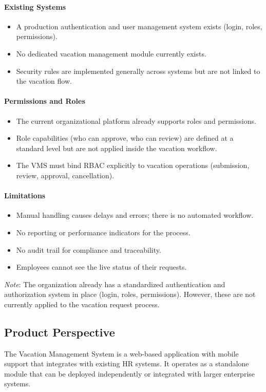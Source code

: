 \documentclass[12pt,a4paper]{article}
\begin{document}
\paragraph{Existing Systems}
\begin{itemize}
    \item A production authentication and user management system exists (login, roles, permissions).
    \item No dedicated vacation management module currently exists.
    \item Security rules are implemented generally across systems but are not linked to the vacation flow.
\end{itemize}

\paragraph{Permissions and Roles}
\begin{itemize}
    \item The current organizational platform already supports roles and permissions.
    \item Role capabilities (who can approve, who can review) are defined at a standard level but are not applied inside the vacation workflow.
    \item The VMS must bind RBAC explicitly to vacation operations (submission, review, approval, cancellation).
\end{itemize}

\paragraph{Limitations}
\begin{itemize}
    \item Manual handling causes delays and errors; there is no automated workflow.
    \item No reporting or performance indicators for the process.
    \item No audit trail for compliance and traceability.
    \item Employees cannot see the live status of their requests.
\end{itemize}

\noindent\textit{Note}: The organization already has a standardized authentication and authorization system in place (login, roles, permissions). However, these are not currently applied to the vacation request process.

\subsection{Product Perspective}
The Vacation Management System is a web-based application with mobile support that integrates with existing HR systems. It operates as a standalone module that can be deployed independently or integrated with larger enterprise systems.
\end{document}
